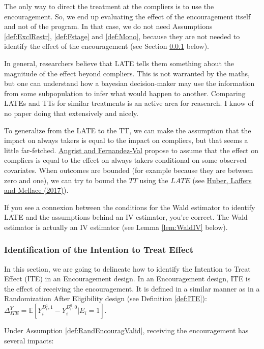 \documentclass[]{book}
\newcommand{\esp}[1]{\mathbb{E}[ #1 ]}
\theoremstyle{definition}
\theoremstyle{definition}
\theoremstyle{definition}
\theoremstyle{remark}
\let\BeginKnitrBlock\begin \let\EndKnitrBlock\end
\begin{document}
The only way to direct the treatment at the compliers is to use the
encouragement. So, we end up evaluating the effect of the encouragement
itself and not of the program. In that case, we do not need Assumptions
\ref{def:ExclRestr}, \ref{def:Fstage} and \ref{def:Mono}, because they
are not needed to identify the effect of the encouragement (see Section
\ref{ITEEncourag} below).

In general, researchers believe that LATE tells them something about the
magnitude of the effect beyond compliers. This is not warranted by the
maths, but one can understand how a bayesian decision-maker may use the
information from some subpopulation to infer what would happen to
another. Comparing LATEs and TTs for similar treatments is an active
area for reasearch. I know of no paper doing that extensively and
nicely.

To generalize from the LATE to the TT, we can make the assumption that
the impact on always takers is equal to the impact on compliers, but
that seems a little far-fetched.
\href{https://www.nber.org/papers/w16566}{Angrist and Fernandez-Val}
propose to assume that the effect on compliers is equal to the effect on
always takers conditional on some observed covariates. When outcomes are
bounded (for example because they are between zero and one), we can try
to bound the \(TT\) using the \(LATE\) (see
\href{https://onlinelibrary.wiley.com/doi/abs/10.1002/jae.2473}{Huber,
Laffers and Mellace (2017)}).

\BeginKnitrBlock{remark}
\iffalse{} {Remark. } \fi{}If you see a connexion between the conditions
for the Wald estimator to identify LATE and the assumptions behind an IV
estimator, you're correct. The Wald estimator is actually an IV
estimator (see Lemma \ref{lem:WaldIV} below).
\EndKnitrBlock{remark}

\subsubsection{Identification of the Intention to Treat
Effect}\label{ITEEncourag}

In this section, we are going to delineate how to identify the Intention
to Treat Effect (ITE) in an Encouragement design. In an Encouragement
design, ITE is the effect of receiving the encouragement. It is defined
in a similar manner as in a Randomization After Eligibility design (see
Definition \ref{def:ITE}):
\(\Delta^Y_{ITE} = \esp{Y_i^{D_i^1,1}-Y_i^{D_i^0,0}|E_i=1}\).

Under Assumption \ref{def:RandEncouragValid}, receiving the
encouragement has several impacts:
\end{document}
